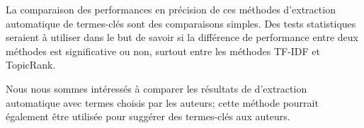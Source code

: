 \smallskip

\noindent La comparaison des performances en précision de ces méthodes d'extraction automatique de termes-clés sont des comparaisons simples. Des tests statistiques seraient à utiliser dans le but de savoir si la différence de performance entre deux méthodes est significative ou non, surtout entre les méthodes TF-IDF et TopicRank.

\smallskip

\noindent Nous nous sommes intéressés à comparer les résultats de d'extraction automatique avec termes choisis par les auteurs; cette méthode pourrait également être utilisée pour suggérer des termes-clés aux auteurs.